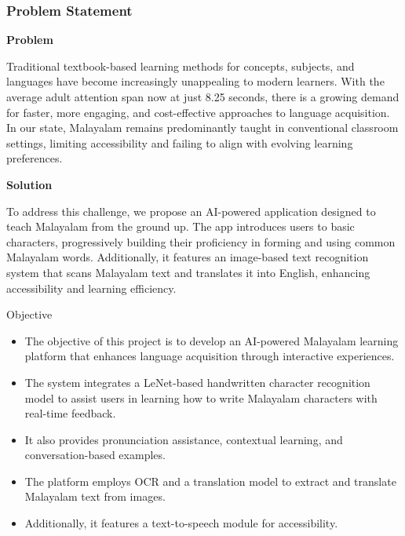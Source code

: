 \documentclass[aspectratio=169]{beamer}
\begin{document}
\begin{frame}
    \frametitle{ Problem Statement }
       \tem\textbf{Problem}
       \item Traditional textbook-based learning methods for concepts, subjects, and languages have become increasingly unappealing to modern learners. With the average adult attention span now at just 8.25 seconds, there is a growing demand for faster, more engaging, and cost-effective approaches to language acquisition. In our state, Malayalam remains predominantly taught in conventional classroom settings, limiting accessibility and failing to align with evolving learning preferences.
       \item\textbf{Solution}
       \item To address this challenge, we propose an AI-powered application designed to teach Malayalam from the ground up. The app introduces users to basic characters, progressively building their proficiency in forming and using common Malayalam words. Additionally, it features an image-based text recognition system that scans Malayalam text and translates it into English, enhancing accessibility and learning efficiency.
\end{frame}

\begin{frame}{Objective}
    \begin{itemize}
        \item The objective of this project is to develop an AI-powered Malayalam learning platform that enhances language acquisition through interactive experiences.
        \item The system integrates a LeNet-based handwritten character recognition model to assist users in learning how to write Malayalam characters with real-time feedback.
        \item It also provides pronunciation assistance, contextual learning, and conversation-based examples.
        \item The platform employs OCR and a translation model to extract and translate Malayalam text from images.
        \item Additionally, it features a text-to-speech module for accessibility.
    \end{itemize}
\end{frame}
\end{document}
